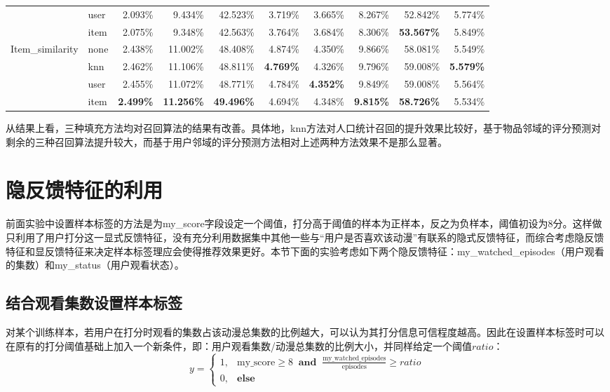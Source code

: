\begin{table}[htbp]
{\begin{tabular}{rlrrrrrrrr}
          & user & 2.093\% & 9.434\% & 42.523\% & 3.719\% & 3.665\% & 8.267\% & 52.842\% & 5.774\% \\
          & item & 2.075\% & 9.348\% & 42.563\% & 3.764\% & 3.684\% & 8.306\% & \textbf{53.567\%} & 5.849\% \\
          \multicolumn{1}{l}{Item\_similarity} & none & 2.438\% & 11.002\% & 48.408\% & 4.874\% & 4.350\% & 9.866\% & 58.081\% & 5.549\% \\
          & knn  & 2.462\% & 11.106\% & 48.811\% & \textbf{4.769\%} & 4.326\% & 9.796\% & 59.008\% & \textbf{5.579\%} \\
          & user & 2.455\% & 11.072\% & 48.771\% & 4.784\% & \textbf{4.352\%} & 9.849\% & 59.008\% & 5.564\% \\
          & item & \textbf{2.499\%} & \textbf{11.256\%} & \textbf{49.496\%} & 4.694\% & 4.348\% & \textbf{9.815\%} & \textbf{58.726\%} & 5.534\% \\
          \bottomrule
      \end{tabular}}%
      \label{tab:missing_imputation_results_3}%
    \end{table}%

    从结果上看，三种填充方法均对召回算法的结果有改善。具体地，knn方法对人口统计召回的提升效果比较好，基于物品邻域的评分预测对剩余的三种召回算法提升较大，而基于用户邻域的评分预测方法相对上述两种方法效果不是那么显著。

  \section{隐反馈特征的利用}
  前面实验中设置样本标签的方法是为my\_score字段设定一个阈值，打分高于阈值的样本为正样本，反之为负样本，阈值初设为8分。这样做只利用了用户打分这一显式反馈特征，没有充分利用数据集中其他一些与“用户是否喜欢该动漫”有联系的隐式反馈特征，而综合考虑隐反馈特征和显反馈特征来决定样本标签理应会使得推荐效果更好。本节下面的实验考虑如下两个隐反馈特征：my\_watched\_episodes（用户观看的集数）和my\_status（用户观看状态）。
    \subsection{结合观看集数设置样本标签}
    对某个训练样本，若用户在打分时观看的集数占该动漫总集数的比例越大，可以认为其打分信息可信程度越高。因此在设置样本标签时可以在原有的打分阈值基础上加入一个新条件，即：用户观看集数/动漫总集数的比例大小，并同样给定一个阈值$ratio$：
    \begin{equation}
    \label{ratio}
    y=\begin{cases}
    1, & \text{my\_score}\geq 8\;\;\textbf{and}\;\;\frac{\text{my\_watched\_episodes}}{\text{episodes}}\geq ratio \\
    0, & \textbf{else}
    \end{cases}
    \end{equation}

